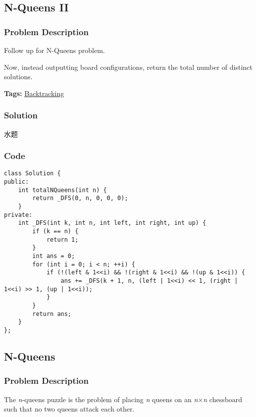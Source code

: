 \documentclass{article}
\begin{document}
\begin{CJK*}{UTF8}{gkai}
\begin{lstlisting}
\end{lstlisting}


\subsection{ N-Queens II }
\label{ N-Queens II }

\subsubsection*{Problem Description}
Follow up for N-Queens problem.

Now, instead outputting board configurations, return the total number of distinct solutions.




\textbf{Tags: }
\hyperref[ Backtracking ]{ Backtracking }



\subsubsection*{Solution}
水题

\subsubsection*{Code}
\begin{lstlisting}
class Solution {
public:
    int totalNQueens(int n) {
        return _DFS(0, n, 0, 0, 0);
    }
private:
    int _DFS(int k, int n, int left, int right, int up) {
        if (k == n) {
            return 1;
        }
        int ans = 0;
        for (int i = 0; i < n; ++i) {
            if (!(left & 1<<i) && !(right & 1<<i) && !(up & 1<<i)) {
                ans += _DFS(k + 1, n, (left | 1<<i) << 1, (right | 1<<i) >> 1, (up | 1<<i));
            }
        }
        return ans;
    }
}; 
\end{lstlisting}


\subsection{ N-Queens }
\label{ N-Queens }

\subsubsection*{Problem Description}
The \emph{n}-queens puzzle is the problem of placing \emph{n} queens on an \emph{n}×\emph{n} chessboard such that no two queens attack each other.




\end{CJK*}
\end{document}
